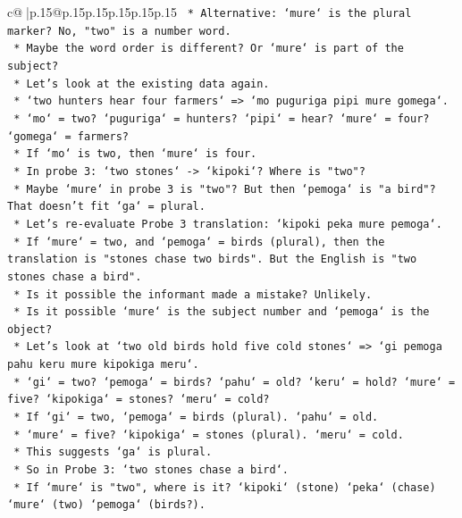 \documentclass{article}
\begin{document}
{\begin{supertabular}{c@{$\;$}|p{.15\linewidth}@{}p{.15\linewidth}p{.15\linewidth}p{.15\linewidth}p{.15\linewidth}p{.15\linewidth}}
{{{\texttt{        *   Alternative: `mure` is the plural marker? No, "two" is a number word.} \\
\texttt{        *   Maybe the word order is different? Or `mure` is part of the subject?} \\
\texttt{        *   Let's look at the existing data again.} \\
\texttt{        *   `two hunters hear four farmers` => `mo puguriga pipi mure gomega`.} \\
\texttt{            *   `mo` = two? `puguriga` = hunters? `pipi` = hear? `mure` = four? `gomega` = farmers?} \\
\texttt{            *   If `mo` is two, then `mure` is four.} \\
\texttt{            *   In probe 3: `two stones` {-}> `kipoki`? Where is "two"?} \\
\texttt{            *   Maybe `mure` in probe 3 is "two"? But then `pemoga` is "a bird"? That doesn't fit `ga` = plural.} \\
\texttt{            *   Let's re{-}evaluate Probe 3 translation: `kipoki peka mure pemoga`.} \\
\texttt{            *   If `mure` = two, and `pemoga` = birds (plural), then the translation is "stones chase two birds". But the English is "two stones chase a bird".} \\
\texttt{            *   Is it possible the informant made a mistake? Unlikely.} \\
\texttt{            *   Is it possible `mure` is the subject number and `pemoga` is the object?} \\
\texttt{            *   Let's look at `two old birds hold five cold stones` => `gi pemoga pahu keru mure kipokiga meru`.} \\
\texttt{                *   `gi` = two? `pemoga` = birds? `pahu` = old? `keru` = hold? `mure` = five? `kipokiga` = stones? `meru` = cold?} \\
\texttt{                *   If `gi` = two, `pemoga` = birds (plural). `pahu` = old.} \\
\texttt{                *   `mure` = five? `kipokiga` = stones (plural). `meru` = cold.} \\
\texttt{                *   This suggests `ga` is plural.} \\
\texttt{                *   So in Probe 3: `two stones chase a bird`.} \\
\texttt{                *   If `mure` is "two", where is it? `kipoki` (stone) `peka` (chase) `mure` (two) `pemoga` (birds?).} \\
}}}
\end{supertabular}}
\end{document}
